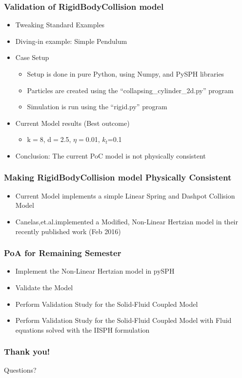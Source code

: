 \documentclass{beamer}
\begin{document}
 \begin{frame} %
  \frametitle{Validation of RigidBodyCollision model}
  	\begin{itemize}
  	 \item Tweaking Standard Examples \pause
  	 \item Diving-in example: Simple Pendulum \pause
  	 \item Case Setup
  	 	\begin{itemize}
  	 	 \item Setup is done in pure Python, using Numpy, and PySPH libraries 
  	 	 \item Particles are created using the ``collapsing\_cylinder\_2d.py'' program
  	 	 \item Simulation is run using the ``rigid.py'' program
  	 	\end{itemize}\pause
  	 \item Current Model results (Best outcome)
  	 \begin{itemize}
  	  \item k$=$8, d$=$2.5, $\eta=$0.01, $k_{t}$=0.1
  	 \end{itemize} \pause
  	 \item Conclusion: The current PoC model is not physically consistent
    \end{itemize}
 \end{frame}
  
 \begin{frame} %
  \frametitle{Making RigidBodyCollision model Physically Consistent}
  \begin{itemize}
   \item Current Model implements a simple Linear Spring and Dashpot Collision Model \pause
   \item Canelas,et.al.\footnotemark  implemented a Modified, Non-Linear Hertzian model in their recently published work (Feb 2016)
  \end{itemize}
 \end{frame}
 
 \begin{frame} %
  \frametitle{PoA for Remaining Semester}
  \begin{itemize}
   \item Implement the Non-Linear Hertzian model in pySPH
   \item Validate the Model \pause
   \item Perform Validation Study for the Solid-Fluid Coupled Model \pause
   \item Perform Validation Study for the Solid-Fluid Coupled Model with Fluid equations  solved with the IISPH formulation
  \end{itemize}
 \end{frame}

 \begin{frame} %
  \frametitle{Thank you!}
  \begin{center}
    \large{Questions?}   
  \end{center}
 \end{frame}
 
\end{document}
